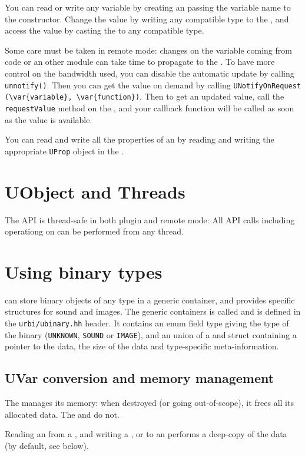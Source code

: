 You can read or write any \urbi variable by creating an
\UVar passing the variable name to the constructor. Change
the value by writing any compatible type to the \UVar, and
access the value by casting the \UVar to any compatible
type.

Some care must be taken in remote mode: changes on the
variable coming from \urbi code or an other module can take time to propagate
to the \UVar. To have more control on the bandwidth used, you can
disable the automatic update by calling \lstinline|unnotify()|. Then you can get
the value on demand by calling
\lstinline|UNotifyOnRequest (\var{variable}, \var{function})|. Then to get an
updated value, call the \lstinline{requestValue} method on the
\UVar, and your callback function will be called as soon as
the value is available.

You can read and write all the \urbi properties of an \UVar by
reading and writing the appropriate \lstinline{UProp} object in the
\UVar.

\section{UObject and Threads}

The \UObject API is thread-safe in both plugin and remote mode: All API calls
including operationg on \UVar can be performed from any thread.

\section{Using binary types}

\urbi can store binary objects of any type in a generic container, and
provides specific structures for sound and images. The generic
containers is called \UBinary and is defined in the
\lstinline{urbi/ubinary.hh} header. It contains an enum field type
giving the type of the binary (\lstinline{UNKNOWN}, \lstinline{SOUND}
or \lstinline{IMAGE}), and an union of a \USound and
\UImage struct containing a pointer to the data, the size
of the data and type-specific meta-information.

\subsection{UVar conversion and memory management}
The \UBinary manages its memory: when destroyed (or going out-of-scope), it
frees all its allocated data. The \USound and \UImage do not.

Reading an \UBinary from a \UVar, and writing a
\UBinary, \USound or \UImage to an \UVar performs a deep-copy of the
data (by default, see below).

